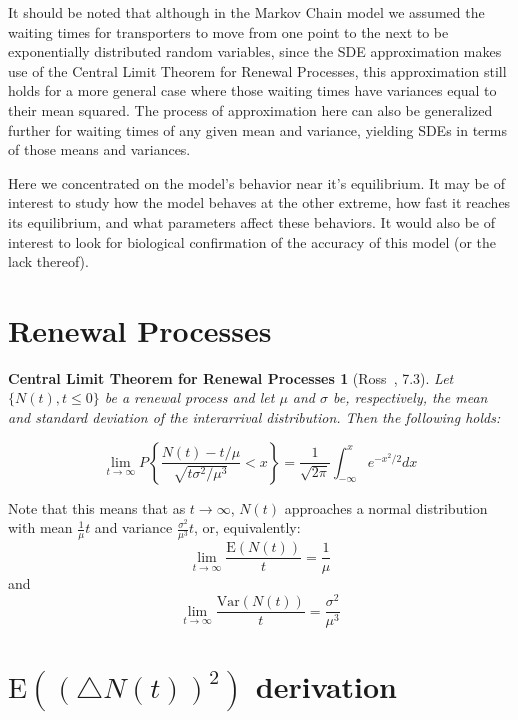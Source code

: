 \documentclass[titlepage]{article}
\newcommand{\var}{\textrm{Var}}
\newcommand{\E}{\textrm{E}}
\newtheorem*{clthm}{Central Limit Theorem for Renewal Processes}
\begin{document}
It should be noted that although in the Markov Chain model we assumed the waiting times for transporters to move from one point to the next to be exponentially distributed random variables, since the SDE approximation makes use of the Central Limit Theorem for Renewal Processes, this approximation still holds for a more general case where those waiting times have variances equal to their mean squared.
The process of approximation here can also be generalized further for waiting times of any given mean and variance, yielding SDEs in terms of those means and variances.

Here we concentrated on the model's behavior near it's equilibrium.
It may be of interest to study how the model behaves at the other extreme, how fast it reaches its equilibrium, and what parameters affect these behaviors.
It would also be of interest to look for biological confirmation of the accuracy of this model (or the lack thereof).

\appendix

\section{Renewal Processes}\label{sec:ren}

\begin{clthm}[Ross~\cite{ross}, 7.3]
Let $\{N(t), t \leq 0 \}$ be a renewal process and let $\mu$ and $\sigma$ be, respectively, the mean and standard deviation of the interarrival distribution. Then the following holds:

\begin{equation*}
\lim_{t \rightarrow \infty} P \left\{
\frac{N(t)-t/\mu}{\sqrt{t\sigma^2/\mu^3}} < x
\right\}
= \frac{1}{\sqrt{2\pi}} \int_{-\infty}^x e^{-x^2/2} dx
\end{equation*}
\end{clthm}

Note that this means that as $t \rightarrow \infty$, $N(t)$ approaches a normal distribution with mean $\frac{1}{\mu}t$ and variance $\frac{\sigma^2}{\mu^3}t$, or, equivalently:
\begin{equation*}
\lim_{t \rightarrow \infty} \frac{\E(N(t))}{t} = \frac{1}{\mu}
\end{equation*}
and
\begin{equation*}
\lim_{t \rightarrow \infty} \frac{\var(N(t))}{t} = \frac{\sigma^2}{\mu^3}
\end{equation*}

\section{ $\E( (\triangle N(t))^2 )$ derivation }\label{sec:deriv}
\end{document}

